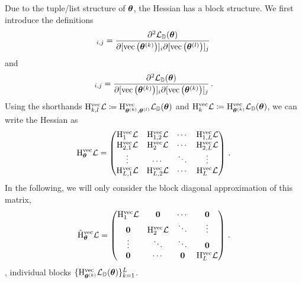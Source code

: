 Due to the tuple/list structure of ${\bm{\theta}}$, the Hessian has a block structure.
We first introduce the definitions
\begin{align*}
  [\hess_{\vtheta^{(k)}, \vtheta^{(l)}}^{\vec} \gL_{\sD}(\vtheta)]_{i,j}
  =
  \frac{\partial^2 \gL_{\sD}(\vtheta)}{\partial [\vec\left(\vtheta^{(k)}\right)]_i \partial [\vec\left(\vtheta^{(l)}\right)]_j}\,
\end{align*}
and
\begin{align*}
  [\hess_{\vtheta^{(k)}}^{\vec} \gL_{\sD}(\vtheta)]_{i,j}
  =
  \frac{\partial^2 \gL_{\sD}(\vtheta)}{\partial [\vec\left(\vtheta^{(k)}\right)]_i \partial [\vec\left(\vtheta^{(k)}\right)]_j}\,.
\end{align*}
Using the shorthands $\mathrm{H}_{k,l}^{\operatorname{vec}} {\mathcal{L}} \coloneq \mathrm{H}_{{\bm{\theta}}^{(k)}, {\bm{\theta}}^{(l)}}^{\operatorname{vec}} {\mathcal{L}}_{{\mathbb{D}}}({\bm{\theta}})$
and $\mathrm{H}_{k}^{\operatorname{vec}} {\mathcal{L}} \coloneq \mathrm{H}_{{\bm{\theta}}^{(k)}}^{\operatorname{vec}} {\mathcal{L}}_{{\mathbb{D}}}({\bm{\theta}})$, we can write the Hessian as
\begin{align*}
  \mathrm{H}_{{\bm{\theta}}}^{\operatorname{vec}} {\mathcal{L}}
  =
  \begin{pmatrix}
    \mathrm{H}_1^{\operatorname{vec}} {\mathcal{L}}
    &
      \mathrm{H}_{1, 2}^{\operatorname{vec}} {\mathcal{L}}
    &
      \cdots
    &
      \mathrm{H}_{1, L}^{\operatorname{vec}} {\mathcal{L}}
    \\
    \mathrm{H}_{2, 1}^{\operatorname{vec}} {\mathcal{L}}
    &
      \mathrm{H}_2^{\operatorname{vec}} {\mathcal{L}}
    &
      \cdots
    &
      \mathrm{H}_{2, L}^{\operatorname{vec}} {\mathcal{L}}
    \\
    \vdots & \cdots & \ddots & \vdots
    \\
    \mathrm{H}_{L, 1}^{\operatorname{vec}} {\mathcal{L}}
    &
      \mathrm{H}_{L, 2}^{\operatorname{vec}} {\mathcal{L}}
    &
      \cdots
    &
      \mathrm{H}_L^{\operatorname{vec}} {\mathcal{L}}
  \end{pmatrix}\,.
\end{align*}
In the following, we will only consider the block diagonal approximation of this matrix,
\begin{align*}
  \tilde{\mathrm{H}}_{{\bm{\theta}}}^{\operatorname{vec}} {\mathcal{L}}
  =
  \begin{pmatrix}
    \mathrm{H}_1^{\operatorname{vec}} {\mathcal{L}} & {\bm{0}} & \cdots & {\bm{0}}
    \\
    {\bm{0}} & \mathrm{H}_2^{\operatorname{vec}} {\mathcal{L}} & \ddots & \vdots
    \\
    \vdots & \ddots & \ddots & {\bm{0}}
    \\
    {\bm{0}} & \cdots & {\bm{0}} & \mathrm{H}_L^{\operatorname{vec}} {\mathcal{L}}
  \end{pmatrix}\,.
\end{align*}
\ie, individual blocks $\{ \mathrm{H}_{{\bm{\theta}}^{(k)}}^{\operatorname{vec}} {\mathcal{L}}_{{\mathbb{D}}}({\bm{\theta}})\}_{k=1}^L$.
